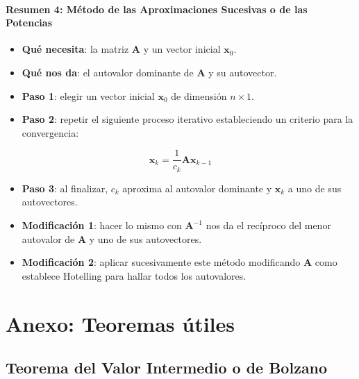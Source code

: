 \documentclass[openany]{book}
\providecommand{\tightlist}{%
  \setlength{\itemsep}{0pt}\setlength{\parskip}{0pt}}
\begin{document}
\hypertarget{resumen-4-muxe9todo-de-las-aproximaciones-sucesivas-o-de-las-potencias}{%
\subsubsection*{Resumen 4: Método de las Aproximaciones Sucesivas o de las Potencias}\label{resumen-4-muxe9todo-de-las-aproximaciones-sucesivas-o-de-las-potencias}}

\begin{itemize}
\tightlist
\item
  \textbf{Qué necesita}: la matriz \(\mathbf{A}\) y un vector inicial \(\mathbf{x}_0\).
\item
  \textbf{Qué nos da}: el autovalor dominante de \(\mathbf{A}\) y su autovector.
\item
  \textbf{Paso 1}: elegir un vector inicial \(\mathbf{x}_0\) de dimensión \(n \times 1\).
\item
  \textbf{Paso 2}: repetir el siguiente proceso iterativo estableciendo un criterio para la convergencia:
\end{itemize}

\[
\textbf{x}_k = \frac{1}{c_k} \textbf{Ax}_{k-1}
\]

\begin{itemize}
\item
  \textbf{Paso 3}: al finalizar, \(c_k\) aproxima al autovalor dominante y \(\mathbf{x}_k\) a uno de sus autovectores.
\item
  \textbf{Modificación 1}: hacer lo mismo con \(\mathbf{A}^{-1}\) nos da el recíproco del menor autovalor de \(\mathbf{A}\) y uno de sus autovectores.
\item
  \textbf{Modificación 2}: aplicar sucesivamente este método modificando \(\mathbf{A}\) como establece Hotelling para hallar todos los autovalores.
\end{itemize}

\hypertarget{anexo-teoremas-uxfatiles}{%
\chapter*{Anexo: Teoremas útiles}\label{anexo-teoremas-uxfatiles}}

\hypertarget{teorema-del-valor-intermedio-o-de-bolzano}{%
\section*{Teorema del Valor Intermedio o de Bolzano}\label{teorema-del-valor-intermedio-o-de-bolzano}}
\end{document}
